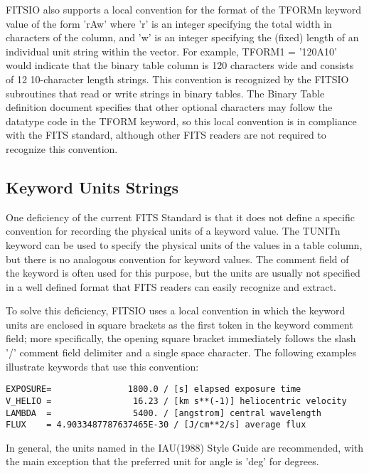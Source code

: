 \documentclass[11pt]{book}
\begin{document}
FITSIO also supports a
local convention for the format of the TFORMn keyword value of the form
'rAw' where 'r' is an integer specifying the total width in characters
of the column, and 'w' is an integer specifying the (fixed) length of
an individual unit string within the vector.  For example, TFORM1 =
'120A10' would indicate that the binary table column is 120 characters
wide and consists of 12 10-character length strings.  This convention
is recognized by the FITSIO subroutines that read or write strings in
binary tables.   The Binary Table definition document specifies that
other optional characters may follow the datatype code in the TFORM
keyword, so this local convention is in compliance with the
FITS standard, although other FITS readers are not required to
recognize this convention.


\subsection{Keyword Units Strings}

One deficiency of the current FITS Standard is that it does not define
a specific convention for recording the physical units of a keyword
value.  The TUNITn keyword can be used to specify the physical units of
the values in a table column, but there is no analogous convention for
keyword values.  The comment field of the keyword is often used for
this purpose, but the units are usually not specified in a well defined
format that FITS readers can easily recognize and extract.

To solve this deficiency, FITSIO uses a local convention in which the
keyword units are enclosed in square brackets as the first token in the
keyword comment field; more specifically, the opening square bracket
immediately follows the slash '/' comment field delimiter and a single
space character.  The following examples illustrate keywords that use
this convention:


\begin{verbatim}
EXPOSURE=               1800.0 / [s] elapsed exposure time
V_HELIO =                16.23 / [km s**(-1)] heliocentric velocity
LAMBDA  =                5400. / [angstrom] central wavelength
FLUX    = 4.9033487787637465E-30 / [J/cm**2/s] average flux
\end{verbatim}

In general, the units named in the IAU(1988) Style Guide are
recommended, with the main exception that the preferred unit for angle
is 'deg' for degrees.
\end{document}
